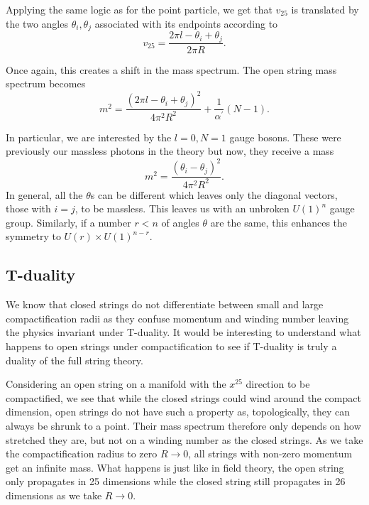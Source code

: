 \documentclass[12pt,letterpaper]{article}
\def\be{\begin{equation}}
\def\ee{\end{equation}}
\begin{document}
Applying the same logic as for the point particle, we get that $v_{25}$ is translated by the two angles $\theta_{i},\theta_{j}$ associated with its endpoints according to
\be\label{vWilson}
v_{25}=\frac{2\pi l-\theta_{i}+\theta_{j}}{2\pi R}.
\ee

Once again, this creates a shift in the mass spectrum.  The open string mass spectrum becomes
\be\label{mass}
m^{2}=\frac{\left(2\pi l-\theta_{i}+\theta_{j}\right)^{2}}{4\pi^{2}R^{2}}+\frac{1}{\alpha^{\prime}}\left(N-1\right).
\ee

In particular, we are interested by the $l=0, N=1$ gauge bosons.  These were previously our massless photons in the theory but now, they receive a mass 
\be
m^{2}=\frac{\left(\theta_{i}-\theta_{j}\right)^{2}}{4\pi^{2}R^{2}}.
\ee
In general, all the $\theta$s can be different which leaves only the diagonal vectors, those with $i=j$, to be massless.  This leaves us with an unbroken $U(1)^{n}$ gauge group.  Similarly, if a number $r<n$ of angles $\theta$ are the same, this enhances the symmetry to $U(r)\times U(1)^{n-r}$.

\subsection*{T-duality}
We know that closed strings do not differentiate between small and large compactification radii as they confuse momentum and winding number leaving the physics invariant under T-duality.  It would be interesting to understand what happens to open strings under compactification to see if T-duality is truly a duality of the full string theory.  

Considering an open string on a manifold with the $x^{25}$ direction to be compactified, we see that while the closed strings could wind around the compact dimension, open strings do not have such a property as, topologically, they can always be shrunk to a point.  Their mass spectrum therefore only depends on how stretched they are, but not on a winding number as the closed strings.  As we take the compactification radius to zero $R\rightarrow0$, all strings with non-zero momentum get an infinite mass.  What happens is just like in field theory, the open string only propagates in 25 dimensions while the closed string still propagates in 26 dimensions as we take $R\rightarrow0$.
\end{document}
